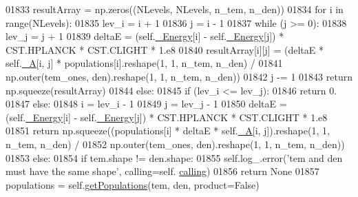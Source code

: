 \begin{DoxyCode}
01833                 resultArray = np.zeros((NLevels, NLevels, n\_tem, n\_den))
01834                 \textcolor{keywordflow}{for} i \textcolor{keywordflow}{in} range(NLevels):
01835                     lev\_i = i + 1
01836                     j = i - 1 
01837                     \textcolor{keywordflow}{while} (j >= 0):
01838                         lev\_j = j + 1
01839                         deltaE = (self.\hyperlink{classpyneb_1_1core_1_1pynebcore_1_1_atom_a52e68715246d258bf0a14f4bd06e89e4}{\_Energy}[i] - self.\hyperlink{classpyneb_1_1core_1_1pynebcore_1_1_atom_a52e68715246d258bf0a14f4bd06e89e4}{\_Energy}[j]) * CST.HPLANCK * 
      CST.CLIGHT * 1.e8 
01840                         resultArray[i][j] = (deltaE * self.\hyperlink{classpyneb_1_1core_1_1pynebcore_1_1_atom_aa6416fe661b8deaa008179314727e025}{\_A}[i, j] * populations[i].reshape(1, 1, n\_tem,
       n\_den) / 
01841                                              np.outer(tem\_ones, den).reshape(1, 1, n\_tem, n\_den))
01842                         j -= 1
01843                 \textcolor{keywordflow}{return} np.squeeze(resultArray)
01844             \textcolor{keywordflow}{else}:
01845                 \textcolor{keywordflow}{if} (lev\_i <= lev\_j):
01846                     \textcolor{keywordflow}{return} 0.
01847                 \textcolor{keywordflow}{else}:
01848                     i = lev\_i - 1
01849                     j = lev\_j - 1
01850                     deltaE = (self.\hyperlink{classpyneb_1_1core_1_1pynebcore_1_1_atom_a52e68715246d258bf0a14f4bd06e89e4}{\_Energy}[i] - self.\hyperlink{classpyneb_1_1core_1_1pynebcore_1_1_atom_a52e68715246d258bf0a14f4bd06e89e4}{\_Energy}[j]) * CST.HPLANCK * CST.CLIGHT *
       1.e8 
01851                     \textcolor{keywordflow}{return} np.squeeze((populations[i] * deltaE * self.\hyperlink{classpyneb_1_1core_1_1pynebcore_1_1_atom_aa6416fe661b8deaa008179314727e025}{\_A}[i, j]).reshape(1, 1, n\_tem, 
      n\_den) / 
01852                                       np.outer(tem\_ones, den).reshape(1, 1, n\_tem, n\_den))
01853         \textcolor{keywordflow}{else}:
01854             \textcolor{keywordflow}{if} tem.shape != den.shape:
01855                 self.log\_.error(\textcolor{stringliteral}{'tem and den must have the same shape'}, calling=self.
      \hyperlink{classpyneb_1_1core_1_1pynebcore_1_1_atom_a373b7735acf4f528b54bddf373ad67a1}{calling})
01856                 \textcolor{keywordflow}{return} \textcolor{keywordtype}{None}
01857             populations = self.\hyperlink{classpyneb_1_1core_1_1pynebcore_1_1_atom_aab7496403c8aaef40ab3b20b5c00e9f0}{getPopulations}(tem, den, product=\textcolor{keyword}{False})

\end{DoxyCode}
